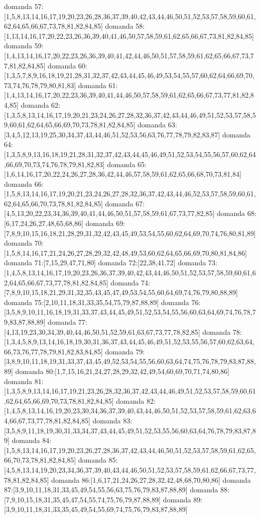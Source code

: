 domanda 57:[1,5,8,13,14,16,17,19,20,23,26,28,36,37,39,40,42,43,44,46,50,51,52,53,57,58,59,60,61,62,64,65,66,67,73,78,81,82,84,85]
domanda 58:[1,13,14,16,17,20,22,23,26,36,39,40,41,46,50,57,58,59,61,62,65,66,67,73,81,82,84,85]
domanda 59:[1,4,13,14,16,17,20,22,23,26,36,39,40,41,42,44,46,50,51,57,58,59,61,62,65,66,67,73,77,81,82,84,85]
domanda 60:[1,3,5,7,8,9,16,18,19,21,28,31,32,37,42,43,44,45,46,49,53,54,55,57,60,62,64,66,69,70,73,74,76,78,79,80,81,83]
domanda 61:[1,4,13,14,16,17,20,22,23,36,39,40,41,44,46,50,57,58,59,61,62,65,66,67,73,77,81,82,84,85]
domanda 62:[1,3,5,8,13,14,16,17,19,20,21,23,24,26,27,28,32,36,37,42,43,44,46,49,51,52,53,57,58,59,60,61,62,64,65,66,69,70,73,78,81,82,84,85]
domanda 63:[3,4,5,12,13,19,25,30,34,37,43,44,46,51,52,53,56,63,76,77,78,79,82,83,87]
domanda 64:[1,3,5,8,9,13,16,18,19,21,28,31,32,37,42,43,44,45,46,49,51,52,53,54,55,56,57,60,62,64,66,69,70,73,74,76,78,79,81,82,83]
domanda 65:[1,6,14,16,17,20,22,24,26,27,28,36,42,44,46,57,58,59,61,62,65,66,68,70,73,81,84]
domanda 66:[1,5,8,13,14,16,17,19,20,21,23,24,26,27,28,32,36,37,42,43,44,46,52,53,57,58,59,60,61,62,64,65,66,70,73,78,81,82,84,85]
domanda 67:[4,5,13,20,22,23,34,36,39,40,41,44,46,50,51,57,58,59,61,67,73,77,82,85]
domanda 68:[6,17,24,26,27,48,65,68,86]
domanda 69:[7,8,9,10,15,16,18,21,28,29,31,32,42,43,45,49,53,54,55,60,62,64,69,70,74,76,80,81,89]
domanda 70:[1,5,8,14,16,17,21,24,26,27,28,29,32,42,48,49,53,60,62,64,65,66,69,70,80,81,84,86]
domanda 71:[7,15,29,47,71,80]
domanda 72:[22,38,41,72]
domanda 73:[1,4,5,8,13,14,16,17,19,20,23,26,36,37,39,40,42,43,44,46,50,51,52,53,57,58,59,60,61,62,64,65,66,67,73,77,78,81,82,84,85]
domanda 74:[7,8,9,10,15,18,21,29,31,32,35,43,45,47,49,53,54,55,60,64,69,74,76,79,80,88,89]
domanda 75:[2,10,11,18,31,33,35,54,75,79,87,88,89]
domanda 76:[3,5,8,9,10,11,16,18,19,31,33,37,43,44,45,49,51,52,53,54,55,56,60,63,64,69,74,76,78,79,83,87,88,89]
domanda 77:[4,13,19,23,30,34,39,40,44,46,50,51,52,59,61,63,67,73,77,78,82,85]
domanda 78:[1,3,4,5,8,9,13,14,16,18,19,30,31,36,37,43,44,45,46,49,51,52,53,55,56,57,60,62,63,64,66,73,76,77,78,79,81,82,83,84,85]
domanda 79:[3,8,9,10,11,18,19,31,33,37,43,45,49,52,53,54,55,56,60,63,64,74,75,76,78,79,83,87,88,89]
domanda 80:[1,7,15,16,21,24,27,28,29,32,42,49,54,60,69,70,71,74,80,86]
domanda 81:[1,3,5,8,9,13,14,16,17,19,21,23,26,28,32,36,37,42,43,44,46,49,51,52,53,57,58,59,60,61,62,64,65,66,69,70,73,78,81,82,84,85]
domanda 82:[1,4,5,8,13,14,16,19,20,23,30,34,36,37,39,40,43,44,46,50,51,52,53,57,58,59,61,62,63,64,66,67,73,77,78,81,82,84,85]
domanda 83:[3,5,8,9,11,18,19,30,31,33,34,37,43,44,45,49,51,52,53,55,56,60,63,64,76,78,79,83,87,89]
domanda 84:[1,5,8,13,14,16,17,19,20,23,26,27,28,36,37,42,43,44,46,50,51,52,53,57,58,59,61,62,65,66,70,73,78,81,82,84,85]
domanda 85:[4,5,8,13,14,19,20,23,34,36,37,39,40,43,44,46,50,51,52,53,57,58,59,61,62,66,67,73,77,78,81,82,84,85]
domanda 86:[1,6,17,21,24,26,27,28,32,42,48,68,70,80,86]
domanda 87:[3,9,10,11,18,31,33,45,49,54,55,56,63,75,76,79,83,87,88,89]
domanda 88:[7,9,10,15,18,31,35,45,47,54,55,74,75,76,79,87,88,89]
domanda 89:[3,9,10,11,18,31,33,35,45,49,54,55,69,74,75,76,79,83,87,88,89]

